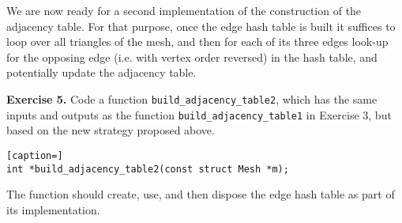 \documentclass[a4paper,11pt]{article}
\begin{document}
\bigskip

We are now ready for a second implementation of the construction of the adjacency
table. For that purpose, once the edge hash table is built it suffices to loop
over all triangles of the mesh, and then for each of its three edges look-up for 
the opposing edge (i.e. with vertex order reversed) in the hash table, and potentially 
update the adjacency table. 

\medskip

{\bf Exercise 5.} Code a function {\tt build\_adjacency\_table2}, which has the same inputs and outputs as the 
function {\tt build\_adjacency\_table1} in Exercise 3, but based on the new strategy proposed above.   
\begin{lstlisting}[caption=]
int *build_adjacency_table2(const struct Mesh *m);
\end{lstlisting}
The function should create, use, and then dispose the edge hash table as part of its implementation. 

\bigskip
\end{document}
